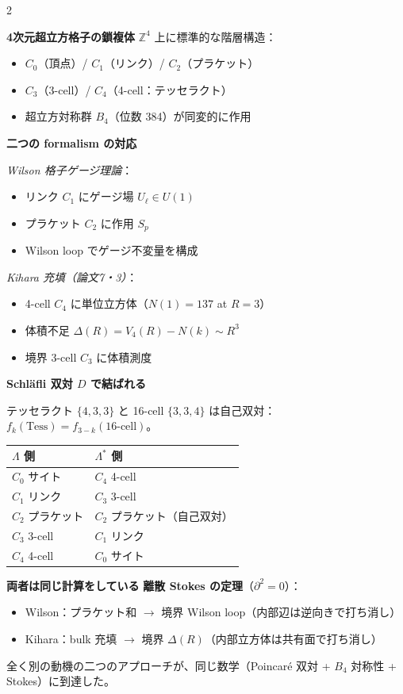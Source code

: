 \documentclass[9pt,a4paper]{ltjsarticle}
\begin{document}
\begin{multicols}{2}
\small

\textbf{4次元超立方格子の鎖複体}\enspace
$\mathbb{Z}^4$ 上に標準的な階層構造：
\begin{itemize}[topsep=1pt]
\item $C_0$（頂点）/ $C_1$（リンク）/ $C_2$（プラケット）
\item $C_3$（3-cell）/ $C_4$（4-cell：テッセラクト）
\item 超立方対称群 $B_4$（位数 384）が同変的に作用
\end{itemize}

\smallskip
\textbf{二つの formalism の対応}\enspace

\textit{Wilson 格子ゲージ理論}：
\begin{itemize}[topsep=1pt]
\item リンク $C_1$ にゲージ場 $U_\ell \in U(1)$
\item プラケット $C_2$ に作用 $S_p$
\item Wilson loop でゲージ不変量を構成
\end{itemize}

\textit{Kihara 充填（論文7・3）}：
\begin{itemize}[topsep=1pt]
\item 4-cell $C_4$ に単位立方体（$N(1)=137$ at $R=3$）
\item 体積不足 $\Delta(R) = V_4(R) - N(k) \sim R^3$
\item 境界 3-cell $C_3$ に体積測度
\end{itemize}

\smallskip
\textbf{Schl\"afli 双対 $D$ で結ばれる}\enspace

テッセラクト $\{4,3,3\}$ と 16-cell $\{3,3,4\}$ は自己双対：$f_k(\text{Tess}) = f_{3-k}(\text{16-cell})$。

\vspace{1pt}
{\footnotesize
\begin{tabular}{@{}ll@{}}
\toprule
$\Lambda$ 側 & $\Lambda^*$ 側 \\
\midrule
$C_0$ サイト & $C_4$ 4-cell \\
$C_1$ リンク & $C_3$ 3-cell \\
$C_2$ プラケット & $C_2$ プラケット（自己双対） \\
$C_3$ 3-cell & $C_1$ リンク \\
$C_4$ 4-cell & $C_0$ サイト \\
\bottomrule
\end{tabular}
}

\smallskip
\textbf{両者は同じ計算をしている}\enspace
\textbf{離散 Stokes の定理}（$\partial^2=0$）：
\begin{itemize}[topsep=1pt]
\item Wilson：プラケット和 $\to$ 境界 Wilson loop（内部辺は逆向きで打ち消し）
\item Kihara：bulk 充填 $\to$ 境界 $\Delta(R)$（内部立方体は共有面で打ち消し）
\end{itemize}
全く別の動機の二つのアプローチが、同じ数学（Poincar\'e 双対 + $B_4$ 対称性 + Stokes）に到達した。


\end{multicols}
\end{document}
